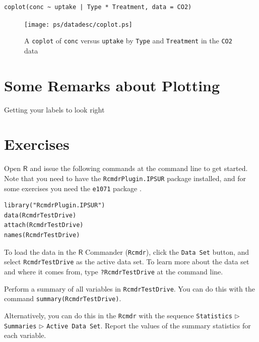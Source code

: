 \documentclass[10pt,english]{scrbook}
\begin{document}
\begin{verbatim}
coplot(conc ~ uptake | Type * Treatment, data = CO2)
\end{verbatim}

\begin{figure}[th]
  \texttt{[image: ps/datadesc/coplot.ps]}
  \caption[A \texttt{coplot} of \texttt{conc} versus \texttt{uptake} by \texttt{Type} and \texttt{Treatment}]{A \texttt{coplot} of \texttt{conc} versus \texttt{uptake} by \texttt{Type} and \texttt{Treatment} in the \texttt{CO2} data}
  \label{fig-coplot}
\end{figure}

\newpage{}
\section[Some Remarks about Plotting]{Some Remarks about Plotting}
\label{sec-1-7}

Getting your labels to look right

\section[Exercises]{Exercises}
\label{sec-1-8}
\setcounter{thm}{0}

Open \(\mathsf{R}\) and issue the following commands at the command line to get started. Note that you need to have the \texttt{RcmdrPlugin.IPSUR} package \cite{RcmdrPlugin.IPSUR} installed, and for some exercises you need the \texttt{e1071} package \cite{e1071}.

\begin{verbatim}
library("RcmdrPlugin.IPSUR")
data(RcmdrTestDrive)
attach(RcmdrTestDrive)
names(RcmdrTestDrive)
\end{verbatim}

To load the data in the \(\mathsf{R}\) Commander (\texttt{Rcmdr}), click the \texttt{Data Set} button, and select \texttt{RcmdrTestDrive} as the active data set. To learn more about the data set and where it comes from, type \texttt{?RcmdrTestDrive} at the command line.

\begin{xca}

Perform a summary of all variables in \texttt{RcmdrTestDrive}. You can do this with the command \texttt{summary(RcmdrTestDrive)}.

Alternatively, you can do this in the \texttt{Rcmdr} with the sequence \texttt{Statistics} \(\triangleright\) \texttt{Summaries} \(\triangleright\) \texttt{Active Data Set}. Report the values of the summary statistics for each variable.
\end{xca}
\end{document}
